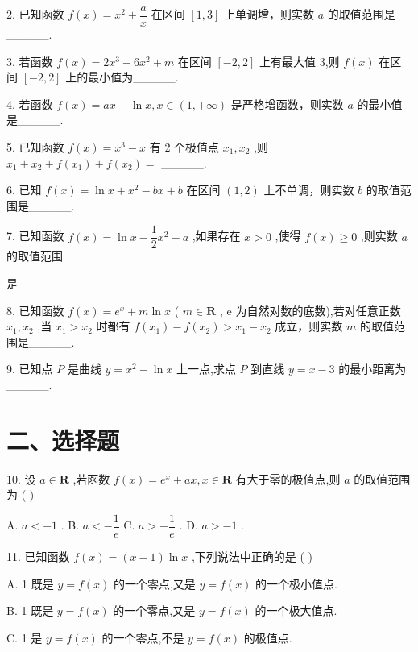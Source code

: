 2. 已知函数 $f\left( x\right)  = {x}^{2} + \dfrac{a}{x}$ 在区间 $\left\lbrack  {1,3}\right\rbrack$ 上单调增，则实数 $a$ 的取值范围是\_\_\_\_\_.

3. 若函数 $f\left( x\right)  = 2{x}^{3} - 6{x}^{2} + m$ 在区间 $\left\lbrack  {-2,2}\right\rbrack$ 上有最大值 3,则 $f\left( x\right)$ 在区间 $\left\lbrack  {-2,2}\right\rbrack$ 上的最小值为\_\_\_\_\_.

4. 若函数 $f\left( x\right)  = {ax} - \ln x,x \in  \left( {1, + \infty }\right)$ 是严格增函数，则实数 $a$ 的最小值是\_\_\_\_\_.

5. 已知函数 $f\left( x\right)  = {x}^{3} - x$ 有 2 个极值点 ${x}_{1},{x}_{2}$ ,则 ${x}_{1} + {x}_{2} + f\left( {x}_{1}\right)  + f\left( {x}_{2}\right)  =$ \_\_\_\_\_.

6. 已知 $f\left( x\right)  = \ln x + {x}^{2} - {bx} + b$ 在区间 $\left( {1,2}\right)$ 上不单调，则实数 $b$ 的取值范围是\_\_\_\_\_.

7. 已知函数 $f\left( x\right)  = \ln x - \dfrac{1}{2}{x}^{2} - a$ ,如果存在 $x > 0$ ,使得 $f\left( x\right)  \geq  0$ ,则实数 $a$ 的取值范围

是

8. 已知函数 $f\left( x\right)  = {{e}}^{x} + m\ln x$ ( $m \in  \mathbf{R}$ , e 为自然对数的底数),若对任意正数 ${x}_{1},{x}_{2}$ ,当 ${x}_{1} > {x}_{2}$ 时都有 $f  \left( {x}_{1}\right)  - f\left( {x}_{2}\right)  > {x}_{1} - {x}_{2}$ 成立，则实数 $m$ 的取值范围是\_\_\_\_\_.

9. 已知点 $P$ 是曲线 $y = {x}^{2} - \ln x$ 上一点,求点 $P$ 到直线 $y = x - 3$ 的最小距离为\_\_\_\_\_.

\section*{二、选择题}

10. 设 $a \in  \mathbf{R}$ ,若函数 $f\left( x\right)  = {{e}}^{x} + {ax},x \in  \mathbf{R}$ 有大于零的极值点,则 $a$ 的取值范围为 ( )

A. $a <  - 1$ . B. $a <  - \dfrac{1}{{e}}$ C. $a >  - \dfrac{1}{{e}}$ . D. $a >  - 1$ .

11. 已知函数 $f\left( x\right)  = \left( {x - 1}\right) \ln x$ ,下列说法中正确的是 ( )

A. 1 既是 $y = f\left( x\right)$ 的一个零点,又是 $y = f\left( x\right)$ 的一个极小值点.

B. 1 既是 $y = f\left( x\right)$ 的一个零点,又是 $y = f\left( x\right)$ 的一个极大值点.

C. 1 是 $y = f\left( x\right)$ 的一个零点,不是 $y = f\left( x\right)$ 的极值点.

